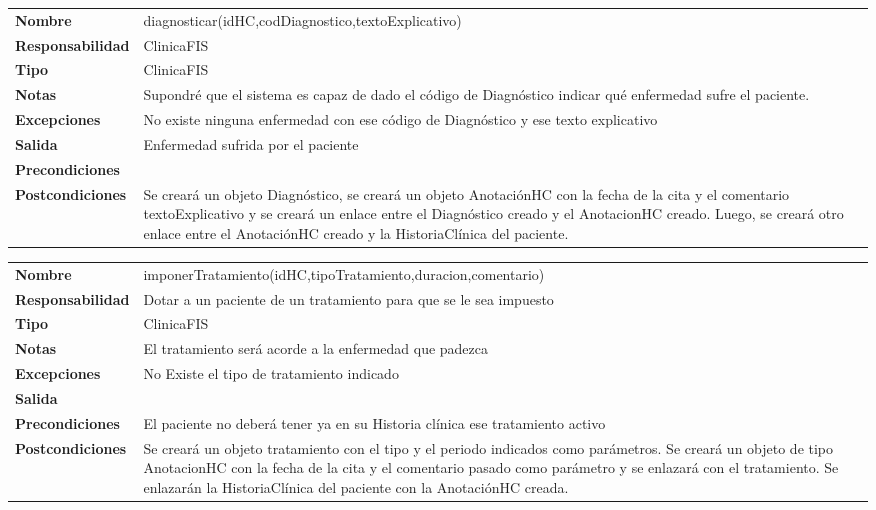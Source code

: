 \begin{table}[htbp]
	  \begin{tabularx}{\textwidth}{l|l}
    \textbf{Nombre}        & diagnosticar(idHC,codDiagnostico,textoExplicativo) \\ 
    \textbf{Responsabilidad}  & ClinicaFIS \\ 
    \textbf{Tipo}        &  ClinicaFIS\\ 
    \textbf{Notas}        &  Supondré que el sistema es capaz de dado el código de Diagnóstico indicar qué enfermedad sufre el paciente.\\ 
    \textbf{Excepciones}    & No existe ninguna enfermedad con ese código de Diagnóstico y ese texto explicativo \\ 
    \textbf{Salida}        & Enfermedad sufrida por el paciente  \\ 
    \textbf{Precondiciones}    &  \\ 
    \textbf{Postcondiciones}  & Se creará un objeto Diagnóstico, se creará un objeto AnotaciónHC con la fecha de la cita y el comentario textoExplicativo y se creará un enlace entre el Diagnóstico creado y el AnotacionHC creado. Luego, se creará otro enlace entre el AnotaciónHC creado y la HistoriaClínica del paciente. \\ 
  \end{tabularx}

\end{table}


\begin{table}[htbp]
	  \begin{tabularx}{\textwidth}{l|l}
    \textbf{Nombre}        & imponerTratamiento(idHC,tipoTratamiento,duracion,comentario) \\ 
    \textbf{Responsabilidad}  & Dotar a un paciente de un tratamiento para que se le sea impuesto  \\ 
    \textbf{Tipo}        & ClinicaFIS \\ 
    \textbf{Notas}        &  El tratamiento será acorde a la enfermedad que padezca\\ 
    \textbf{Excepciones}    & No Existe el tipo de tratamiento indicado \\ 
    \textbf{Salida}        &  \\ 
    \textbf{Precondiciones}    & El paciente no deberá tener ya en su Historia clínica ese tratamiento activo \\ 
    \textbf{Postcondiciones}  &  Se creará un objeto tratamiento con el tipo y el periodo indicados como parámetros. Se creará un objeto de tipo AnotacionHC con la fecha de la cita y el comentario pasado como parámetro y se enlazará con el tratamiento. Se enlazarán la HistoriaClínica del paciente con la AnotaciónHC creada.\\ 
  \end{tabularx}

\end{table}




